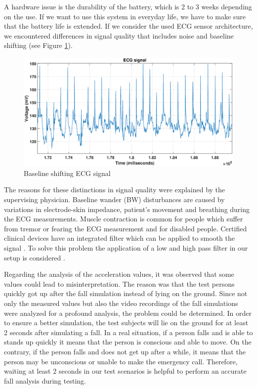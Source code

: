 \documentclass[10pt,journal,compsoc]{IEEEtran}
\begin{document}
A hardware issue is the durability of the battery, which is 2 to 3 weeks depending on the use. If we want to use this system in everyday life, we have to make sure that the battery life is extended. If we consider the used ECG sensor architecture, we encountered differences in signal quality that includes noise and baseline shifting (see Figure \ref{fig:ECGBaselineShifting}). 
\begin{figure}[!ht]
	\centering
	\includegraphics[scale=0.2425]{Images/NormalECG1.eps}
	\caption[Measured ECG signal]{Baseline shifting ECG signal \cite{FatimaMasterThesis}}
	\label{fig:ECGBaselineShifting}
\end{figure}

The reasons for these distinctions in signal quality were explained by the supervising physician. Baseline wander (BW) disturbances are caused by variations in electrode-skin impedance, patient's movement and breathing during the ECG measurements. Muscle contraction is common for people which suffer from tremor or fearing the ECG measurement and for disabled people. Certified clinical devices have an integrated filter which can be applied to smooth the signal \cite{ECGNoise,DrNicoletteWagner}. To solve this problem the application of a low and high pass filter in our setup is considered \cite{FatimaMasterThesis}.

Regarding the analysis of the acceleration values, it was observed that some values could lead to misinterpretation. The reason was that the test persons quickly got up after the fall simulation instead of lying on the ground.
Since not only the measured values but also the video recordings of the fall simulations were analyzed for a profound analysis, the problem could be determined. In order to ensure a better simulation, the test subjects will lie on the ground for at least 2 seconds after simulating a fall. In a real situation, if a person falls and is able to stands up quickly it means that the person is conscious and able to move. On the contrary, if the person falls and does not get up after a while, it means that the person may be unconscious or unable to make the emergency call.  Therefore, waiting at least 2 seconds in our test scenarios is helpful to perform an accurate fall analysis during testing.
\end{document}
